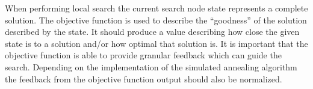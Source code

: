 \begin{enumerate}
\begin{enumerate}
When performing local search the current search node state represents a complete solution. The objective function is used to describe the ``goodness'' of the solution described by the state. It should produce a value describing how close the given state is to a solution and/or how optimal that solution is. It is important that the objective function is able to provide granular feedback which can guide the search. Depending on the implementation of the simulated annealing algorithm the feedback from the objective function output should also be normalized.
\end{enumerate}

\end{enumerate}



